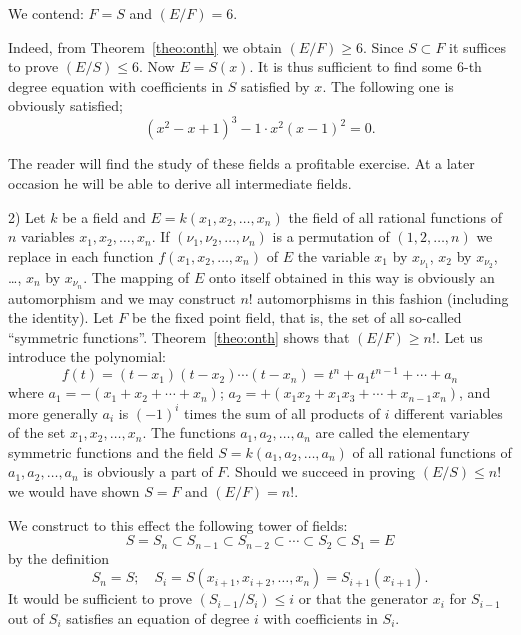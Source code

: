 \documentclass[10pt,leqno,a5paper]{book}
\theoremstyle{definition}
\begin{document}
We contend: $F = S$ and $(E/F) = 6$.

Indeed, from Theorem~\ref{theo:onth} we obtain $(E/F) \geq 6$.
Since $S \subset F$ it suffices to prove $(E/S) \leq 6$.
Now $E = S(x)$.
It is thus sufficient to find some 6-th degree equation with coefficients in $S$ satisfied by $x$.
The following one is obviously satisfied;
\[
(x^2 - x + 1)^3 - 1 \cdot x^2(x-1)^2 = 0.
\]

The reader will find the study of these fields a profitable exercise.
At a later occasion he will be able to derive all intermediate fields.


2)
Let $k$ be a field and $E = k(x_1, x_2, \ldots, x_n)$ the field of all rational functions of $n$ variables $x_1,x_2, \ldots, x_n$.
If $(\nu_1, \nu_2, \ldots, \nu_n)$ is a permutation of $(1,2,\ldots,n)$ we replace in each function $f(x_1,x_2,\ldots,x_n)$ of $E$ the variable $x_1$ by $x_{\nu_1}$, $x_2$ by $x_{\nu_2}$, \ldots, $x_n$ by $x_{\nu_n}$.
The mapping of $E$ onto itself obtained in this way is obviously an automorphism and we may construct $n!$ automorphisms in this fashion (including the identity).
Let $F$ be the fixed point field, that is, the set of all so-called ``symmetric functions''.
Theorem~\ref{theo:onth} shows that $(E/F) \geq n!$.
Let us introduce the polynomial:
\begin{equation}
\label{eq:twGth}
f(t) = (t-x_1)(t-x_2) \cdots (t-x_n)
= t^n + a_1 t^{n-1} + \cdots + a_n
\end{equation}
where $a_1 = -(x_1 + x_2 + \cdots + x_n)$; $a_2 = +(x_1x_2 + x_1x_3 + \cdots + x_{n-1}x_n)$, and more generally $a_i$ is $(-1)^i$ times the sum of all products of $i$ different variables of the set $x_1, x_2, \ldots, x_n$.
The functions $a_1, a_2, \ldots, a_n$ are called the elementary symmetric functions and the field $S = k(a_1, a_2, \ldots, a_n)$ of all rational functions of $a_1, a_2, \ldots, a_n$ is obviously a part of $F$.
Should we succeed in proving $(E/S) \leq n!$ we would have shown $S = F$ and $(E/F) = n!$.

We construct to this effect the following tower of fields:
\[
S = S_n
\subset S_{n-1}
\subset S_{n-2}
\subset \cdots
\subset S_2
\subset S_1 = E
\]
by the definition
\begin{equation}
\label{eq:twGfo}
S_n = S;
\quad
S_i = S(x_{i+1}, x_{i+2}, \ldots, x_n) = S_{i+1}(x_{i+1}).
\end{equation}
It would be sufficient to prove $(S_{i-1} / S_i) \leq i$ or that the generator $x_i$ for $S_{i-1}$ out of $S_i$ satisfies an equation of degree $i$ with coefficients in $S_i$.
\end{document}
